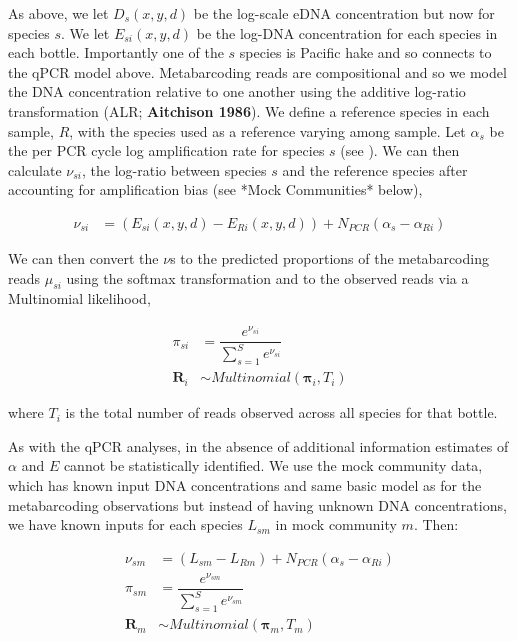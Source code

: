 \documentclass{article}
\begin{document}
As above, we let $D_s(x,y,d)$ be the log-scale eDNA concentration but now for species $s$. We let $E_{si}(x,y,d)$ be the log-DNA concentration for each species in each bottle. Importantly one of the $s$ species is Pacific hake and so connects to the qPCR model above. Metabarcoding reads are compositional and so we model the DNA concentration relative to one another using the additive log-ratio transformation (ALR; \textbf{Aitchison 1986}).  We define a reference species in each sample, $R$, with the species used as a reference varying among sample. Let $\alpha_s$ be the per PCR cycle log amplification rate for species $s$ (see \cite{shelton2023}).  We can then calculate $\nu_{si}$, the log-ratio between species $s$ and the reference species after accounting for amplification bias (see *Mock Communities* below),

\begin{align} 
  \nu_{si} &= \left( E_{si}(x,y,d) - E_{Ri}(x,y,d)\right) + N_{PCR} \left(\alpha_s - \alpha_{Ri} \right) 
\end{align}

We can then convert the $\nu$s to the predicted proportions of the metabarcoding reads $\mu_{si}$ using the softmax transformation and to the observed reads via a Multinomial likelihood,

\begin{align} 
  \pi_{si} &= \dfrac{e^{\nu_{si}}}{\sum_{s=1}^S e^{\nu_{si}}} \\
  \boldsymbol{R}_{i} & \sim Multinomial\left(\boldsymbol{\pi}_{i},T_{i}\right) 
\end{align}

where $T_{i}$ is the total number of reads observed across all species for that bottle. 

As with the qPCR analyses, in the absence of additional information estimates of $\alpha$ and $E$ cannot be statistically identified.  We use the mock community data, which has known input DNA concentrations and  same basic model as for the metabarcoding observations but instead of having unknown DNA concentrations, we have known inputs for each species $L_{sm}$ in mock community $m$. Then:

\begin{align} 
 \nu_{sm} &= \left( L_{sm} - L_{Rm}\right) + N_{PCR} \left(\alpha_s - \alpha_{Ri} \right) \\
  \pi_{sm} &= \dfrac{e^{\nu_{sm}}}{\sum_{s=1}^S e^{\nu_{sm}}} \\
  \boldsymbol{R}_{m} & \sim Multinomial\left(\boldsymbol{\pi}_{m},T_{m}\right) 
\end{align}
\end{document}
